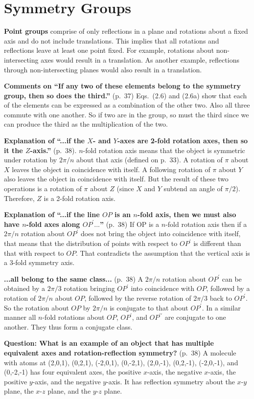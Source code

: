 \chapter{Symmetry Groups}

{\bf Point groups} comprise of only reflections in a plane and
rotations about a fixed axis and do not include translations. This
implies that all rotations and reflections leave at least one point
fixed. For example, rotations about non-intersecting axes would result
in a translation. As another example, reflections through
non-intersecting planes would also result in a translation.

{\bf Comments on ``If any two of these elements belong to the symmetry
  group, then so does the third.''} (p.\ 37) Eqs.\ (2.6) and (2.6a)
show that each of the elements can be expressed as a combination of
the other two. Also all three commute with one another. So if two are
in the group, so must the third since we can produce the third as the
multiplication of the two.

{\bf Explanation of ``...if the $X$- and $Y$-axes are 2-fold rotation
  axes, then so it the $Z$-axis.''} (p.\ 38). $n$-fold rotation axis
means that the object is symmetric under rotation by $2\pi/n$ about
that axis (defined on p.\ 33).  A rotation of $\pi$ about $X$ leaves
the object in coincidence with itself. A following rotation of $\pi$
about $Y$ also leaves the object in coincidence with itself. But the
result of these two operations is a rotation of $\pi$ about $Z$ (since
$X$ and $Y$ subtend an angle of $\pi/2$). Therefore, $Z$ is a 2-fold
rotation axis.

{\bf Explanation of ``...if the line $OP$ is an $n$-fold axis, then we
  must also have $n$-fold axes along $OP^\prime...$''} (p.\ 38) If OP
is a $n$-fold rotation axis then if a $2\pi/n$ rotation about $OP^\prime$
does not bring the object into coincidence with itself, that means
that the distribution of points with respect to $OP^\prime$ is
different than that with respect to $OP$. That contradicts the
assumption that the vertical axis is a 3-fold symmetry axis.

{\bf ...all belong to the same class...} (p.\ 38) A $2\pi/n$ rotation about
$OP^\prime$ can be obtained by a $2\pi/3$ rotation bringing $OP^\prime$ into
coincidence with $OP$, followed by a rotation of $2\pi/n$ about $OP$,
followed by the reverse rotation of $2\pi/3$ back to $OP^\prime$. So the
rotation about $OP$ by $2\pi/n$ is conjugate to that about $OP^\prime$. In a
similar manner all $n$-fold rotations about $OP$, $OP^\prime$, and
$OP^{\prime\prime}$ are conjugate to one another. They thus form a
conjugate class.

{\bf Question: What is an example of an object that has multiple equivalent axes and rotation-reflection symmetry?} (p.\ 38)
A molecule with atoms at (2,0,1), (0,2,1), (-2,0,1), (0,-2,1), (2,0,-1), (0,2,-1), (-2,0,-1), and (0,-2,-1) has four equivalent axes, the positive $x$-axis, the negative $x$-axis, the positive $y$-axis, and the negative $y$-axis. It has reflection symmetry about the $x$-$y$ plane, the $x$-$z$ plane, and the $y$-$z$ plane.
